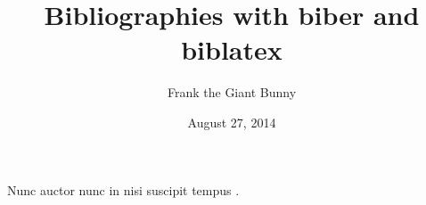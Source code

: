 \documentclass{article}
\begin{document}
\title{Bibliographies with biber and biblatex}
\author{Frank the Giant Bunny}
\date{August 27, 2014}
\maketitle

Nunc auctor nunc in nisi suscipit tempus \cite{black1973poa}.

\printbibliography
\end{document}
